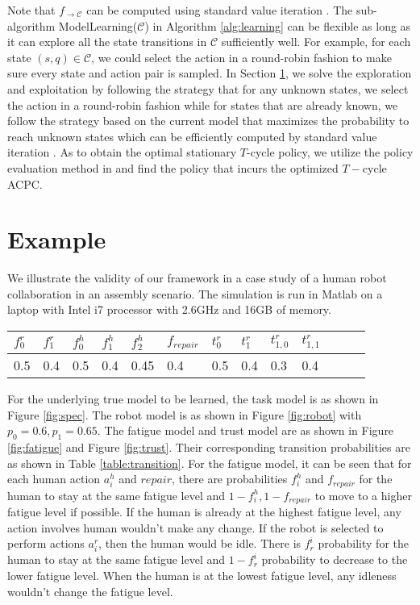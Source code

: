 \documentclass[journal]{IEEEtran}
\begin{document}
Note that $f_{\rightarrow\mathcal{C}}$ can be computed using standard value iteration \cite{rutten2004mathematical}. The sub-algorithm ModelLearning($\mathcal{C}$) in Algorithm \ref{alg:learning} can be flexible as long as it can explore all the state transitions in $\mathcal{C}$ sufficiently well. For example, for each state $(s,q)\in\mathcal{C}$, we could select the action in a round-robin fashion to make sure every state and action pair is sampled. In Section \ref{sec:simulation}, we solve the exploration and exploitation by following the  strategy  that for any unknown states, we select the action in a round-robin fashion while for states that are already known, we follow the strategy based on the current model that maximizes the probability to reach unknown states which can be efficiently computed by standard value iteration \cite{bertsekas1995dynamic}. As to obtain the optimal stationary $T$-cycle policy, we utilize the policy evaluation method in \cite{ding2014optimal} and find the policy that incurs the optimized $T-$cycle ACPC. 

\section{Example}\label{sec:simulation}
We illustrate the validity of our framework in a case study of a human robot collaboration in an  assembly scenario. The simulation is run in Matlab on a laptop with Intel i7 processor with 2.6GHz  and 16GB of memory. 

\begin{table*}[t]
	\centering
	\begin{tabular}{|l|l|l|l|l|l|l|l|l|l|l|l|l|}
		\hline
		$f_0^r$ & $f_1^r$  & $f_0^h$ & $f_1^h$ & $f_2^h$& $f_{repair}$ & $t_0^r$ & $t_1^r$& $t_{1,0}^r$ & $t_{1,1}^r$\\ 
		\hline
		0.5 & 0.4 &  0.5 & 0.4 & 0.45 & 0.4 & 0.5 & 0.4 & 0.3 & 0.4 \\
		\hline
		
	\end{tabular}
	\caption{Transition probabilities}
	\label{table:transition}
\end{table*}


For the underlying true model to be learned, the task model is as shown in Figure \ref{fig:spec}. The robot model is as shown in Figure \ref{fig:robot} with $p_0=0.6,p_1=0.65$. The fatigue model and trust model are as shown in Figure \ref{fig:fatigue} and Figure \ref{fig:trust}. Their corresponding transition probabilities are as shown in Table \ref{table:transition}. For the fatigue model, it can be seen that for each human action $a_i^h$ and $repair$, there are probabilities $f_i^h$ and $f_{repair}$ for the human to stay at the same fatigue level and $1-f_i^h,1-f_{repair}$ to move to a higher fatigue level if possible. If the human is already at the highest fatigue level, any action involves human wouldn't make any change. If the robot is selected to perform actions $a_i^r$, then the human would be idle. There is $f^i_r$ probability for the human to stay at the same fatigue level and $1-f^i_r$ probability to decrease to the lower fatigue level. When the human is at the lowest fatigue level, any idleness wouldn't change the fatigue level.
\end{document}
